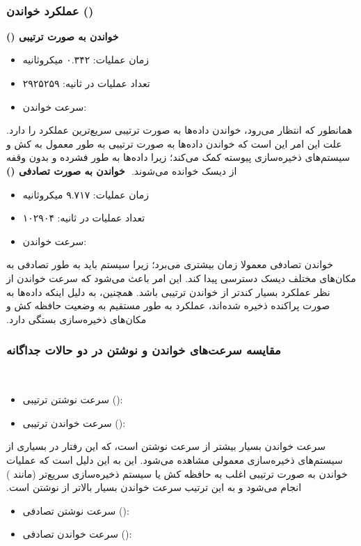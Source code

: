‫
‫\subsubsection*{عملکرد خواندن ()}
‫
‫\textbf{خواندن به صورت ترتیبی ()}
‫\begin{itemize}
‫    \item زمان عملیات: ۰.۳۴۲ میکروثانیه
‫    \item تعداد عملیات در ثانیه: ۲۹۲۵۲۵۹
‫    \item سرعت خواندن: 
‫\end{itemize}
‫
‫همانطور که انتظار می‌رود، خواندن داده‌ها به صورت ترتیبی سریع‌ترین عملکرد را دارد. علت این امر این است که خواندن داده‌ها به صورت ترتیبی به طور معمول به کش و سیستم‌های ذخیره‌سازی پیوسته کمک می‌کند؛ زیرا داده‌ها به طور فشرده و بدون وقفه از دیسک خوانده می‌شوند.
‫
‫\textbf{خواندن به صورت تصادفی ()}
‫\begin{itemize}
‫    \item زمان عملیات: ۹.۷۱۷ میکروثانیه
‫    \item تعداد عملیات در ثانیه: ۱۰۲۹۰۴
‫    \item سرعت خواندن: 
‫\end{itemize}
‫
‫خواندن تصادفی معمولا زمان بیشتری می‌برد؛ زیرا سیستم باید به طور تصادفی به مکان‌های مختلف دیسک دسترسی پیدا کند. این امر باعث می‌شود که سرعت خواندن از نظر عملکرد بسیار کندتر از خواندن ترتیبی باشد. همچنین، به دلیل اینکه داده‌ها به صورت پراکنده ذخیره شده‌اند، عملکرد به طور مستقیم به وضعیت حافظه کش و مکان‌های ذخیره‌سازی بستگی دارد.
‫
‫\subsubsection*{مقایسه سرعت‌های خواندن و نوشتن در دو حالات جداگانه}
‫\begin{itemize}
‫    \item سرعت نوشتن ترتیبی (): 
‫    \item سرعت خواندن ترتیبی (): 
‫\end{itemize}
‫سرعت خواندن بسیار بیشتر از سرعت نوشتن است، که این رفتار در بسیاری از سیستم‌های ذخیره‌سازی معمولی مشاهده می‌شود. این به این دلیل است که عملیات خواندن به صورت ترتیبی اغلب به حافظه کش یا سیستم ذخیره‌سازی سریع‌تر (مانند ) انجام می‌شود و به این ترتیب سرعت خواندن بسیار بالاتر از نوشتن است.
‫
‫\begin{itemize}
‫    \item سرعت نوشتن تصادفی (): 
‫    \item سرعت خواندن تصادفی (): 
‫\end{itemize}
